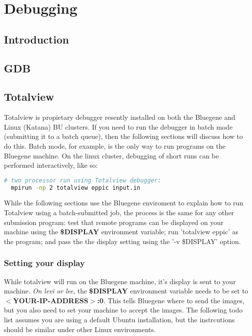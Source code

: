 
\chapter{Debugging}

\section{Introduction}


\section{GDB}


\section{Totalview}

Totalview is propietary debugger resently installed on both the
Bluegene and Linux (Katana) BU clusters. If you need to run the
debugger in batch mode (submitting it to a batch queue), then the
following sections will discuss how to do this. Batch mode, for
example, is the only way to run programs on the Bluegene machine. On
the linux cluster, debugging of short runs can be performed
interactively, like so:
\begin{lstlisting}[language=Bash]
  # two processor run using Totalview debugger:
  mpirun -np 2 totalview eppic input.in
\end{lstlisting}

While the following sections use the Bluegene enviroment to explain
how to run Totalview using a batch-submitted job, the process is the
same for any other submission program: test that remote programs can
be displayed on your machine using the
\textbf{\$DISPLAY} environment 
variable; run 'totalview eppic' as the program; and pass the the
display setting using the '-v \$DISPLAY' option. 

\subsection{Setting your display}
While totalview will run on the Bluegene machine, it's display is sent
to your machine. \emph{On levi or lee}, the \textbf{\$DISPLAY}
environment variable needs to be set to
\textbf{$<$YOUR-IP-ADDRESS$>$:0}. This tells Bluegene where to send
the images, but you also need to set your machine to accept the
images. The following todo list assumes you are using a default Ubuntu
installation, but the instrcutions should be similar under other Linux
environments.\\ 

